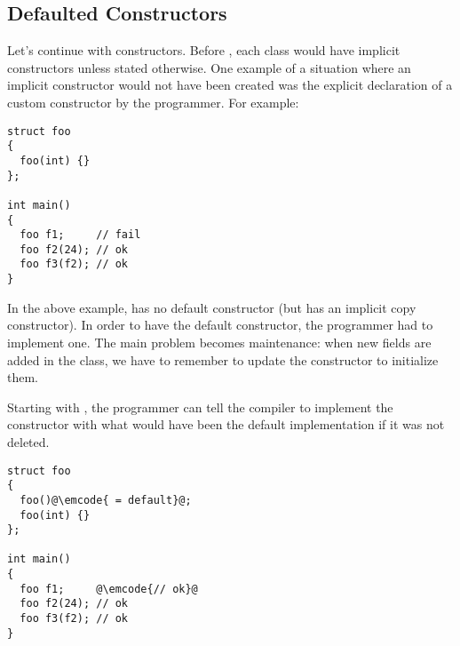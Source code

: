 \subsection{Defaulted Constructors}

Let's continue with constructors. Before , each class would have
implicit constructors unless stated otherwise. One example of a
situation where an implicit constructor would not have been created
was the explicit declaration of a custom constructor by the
programmer. For example:

\begin{lstlisting}
struct foo
{
  foo(int) {}
};

int main()
{
  foo f1;     // fail
  foo f2(24); // ok
  foo f3(f2); // ok
}
\end{lstlisting}

In the above example,  has no default constructor (but has
an implicit copy constructor). In order to have the default
constructor, the programmer had to implement one. The main problem
becomes maintenance: when new fields are added in the class, we have
to remember to update the constructor to initialize them.

Starting with , the programmer can tell the compiler to
implement the constructor with what would have been the default
implementation if it was not deleted.

\begin{lstlisting}
struct foo
{
  foo()@\emcode{ = default}@;
  foo(int) {}
};

int main()
{
  foo f1;     @\emcode{// ok}@
  foo f2(24); // ok
  foo f3(f2); // ok
}
\end{lstlisting}
